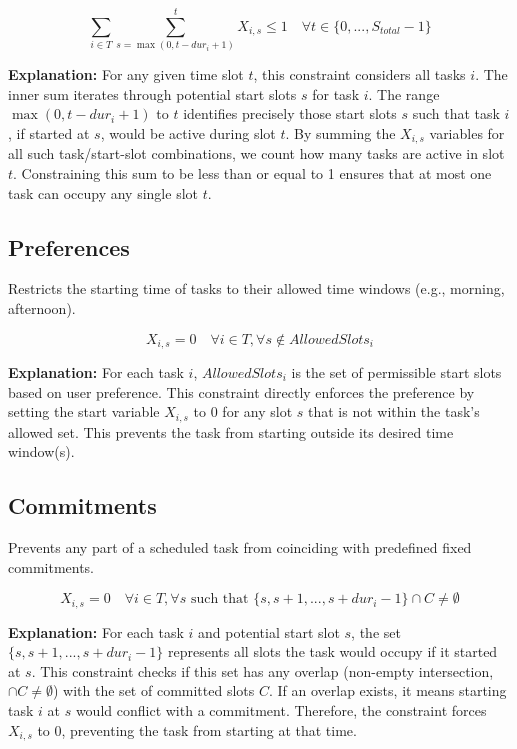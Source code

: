 \documentclass{article}
\begin{document}
\[
\sum_{i \in T} \sum_{s = \max(0, t - dur_i + 1)}^{t} X_{i,s} \le 1 \quad \forall t \in \{0, ..., S_{total}-1\}
\]

\textbf{Explanation:} For any given time slot $t$, this constraint considers all tasks $i$. The inner sum iterates through potential start slots $s$ for task $i$. The range $\max(0, t - dur_i + 1)$ to $t$ identifies precisely those start slots $s$ such that task $i$, if started at $s$, would be active during slot $t$. By summing the $X_{i,s}$ variables for all such task/start-slot combinations, we count how many tasks are active in slot $t$. Constraining this sum to be less than or equal to 1 ensures that at most one task can occupy any single slot $t$.

\subsection{Preferences}
Restricts the starting time of tasks to their allowed time windows (e.g., morning, afternoon).

\[
X_{i,s} = 0 \quad \forall i \in T, \forall s \notin AllowedSlots_i
\]

\textbf{Explanation:} For each task $i$, $AllowedSlots_i$ is the set of permissible start slots based on user preference. This constraint directly enforces the preference by setting the start variable $X_{i,s}$ to 0 for any slot $s$ that is not within the task's allowed set. This prevents the task from starting outside its desired time window(s).

\subsection{Commitments}
Prevents any part of a scheduled task from coinciding with predefined fixed commitments.

\[
X_{i,s} = 0 \quad \forall i \in T, \forall s \text{ such that } \{s, s+1, ..., s + dur_i - 1\} \cap C \neq \emptyset
\]

\textbf{Explanation:} For each task $i$ and potential start slot $s$, the set $\{s, s+1, ..., s + dur_i - 1\}$ represents all slots the task would occupy if it started at $s$. This constraint checks if this set has any overlap (non-empty intersection, $\cap C \neq \emptyset$) with the set of committed slots $C$. If an overlap exists, it means starting task $i$ at $s$ would conflict with a commitment. Therefore, the constraint forces $X_{i,s}$ to 0, preventing the task from starting at that time.
\end{document}
